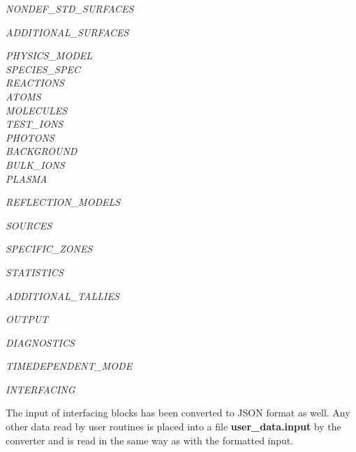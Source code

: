 \medskip

\textsl{NONDEF\_STD\_SURFACES}

\medskip

\textsl{ADDITIONAL\_SURFACES}

\medskip

\textsl{PHYSICS\_MODEL} \\
	\hspace*{1cm} \textsl{SPECIES\_SPEC} \\
   		\hspace*{2cm} \textsl{REACTIONS} \\
		\hspace*{2cm} \textsl{ATOMS} \\
		\hspace*{2cm} \textsl{MOLECULES} \\
		\hspace*{2cm} \textsl{TEST\_IONS} \\
		\hspace*{2cm} \textsl{PHOTONS} \\
	\hspace*{1cm} \textsl{BACKGROUND} \\
		\hspace*{2cm} \textsl{BULK\_IONS} \\
		\hspace*{2cm} \textsl{PLASMA} 

\medskip

\textsl{REFLECTION\_MODELS}

\medskip

\textsl{SOURCES}

\medskip

\textsl{SPECIFIC\_ZONES}

\medskip

\textsl{STATISTICS}

\medskip

\textsl{ADDITIONAL\_TALLIES} 

\medskip

\textsl{OUTPUT}

\medskip

\textsl{DIAGNOSTICS}

\medskip

\textsl{TIMEDEPENDENT\_MODE}

\medskip

\textsl{INTERFACING}

\medskip

The input of interfacing blocks has been converted to JSON format as well. Any other data
read by user routines is placed into a file \textbf{user\_data.input} by the converter and is read
in the same way as with the formatted input.

